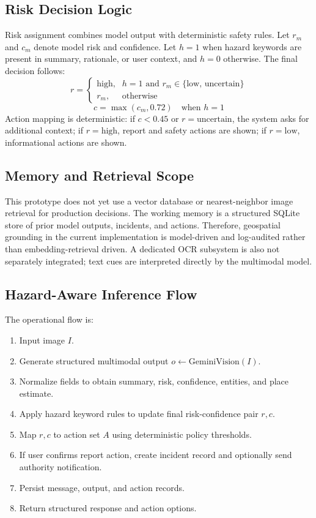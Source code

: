 \documentclass[10pt,conference]{IEEEtran}
\begin{document}
\subsection{Risk Decision Logic}
Risk assignment combines model output with deterministic safety rules. Let $r_m$ and $c_m$ denote model risk and confidence. Let $h=1$ when hazard keywords are present in summary, rationale, or user context, and $h=0$ otherwise. The final decision follows:
\begin{equation}
r =
\begin{cases}
\text{high}, & h=1 \text{ and } r_m \in \{\text{low, uncertain}\} \\
r_m, & \text{otherwise}
\end{cases}
\end{equation}
\begin{equation}
c = \max(c_m, 0.72) \quad \text{when } h=1
\end{equation}
Action mapping is deterministic: if $c<0.45$ or $r=\text{uncertain}$, the system asks for additional context; if $r=\text{high}$, report and safety actions are shown; if $r=\text{low}$, informational actions are shown.

\subsection{Memory and Retrieval Scope}
This prototype does not yet use a vector database or nearest-neighbor image retrieval for production decisions. The working memory is a structured SQLite store of prior model outputs, incidents, and actions. Therefore, geospatial grounding in the current implementation is model-driven and log-audited rather than embedding-retrieval driven. A dedicated OCR subsystem is also not separately integrated; text cues are interpreted directly by the multimodal model.

\subsection{Hazard-Aware Inference Flow}
The operational flow is:
\begin{enumerate}
\item Input image $I$.
\item Generate structured multimodal output $o \leftarrow \mathrm{GeminiVision}(I)$.
\item Normalize fields to obtain summary, risk, confidence, entities, and place estimate.
\item Apply hazard keyword rules to update final risk-confidence pair $r,c$.
\item Map $r,c$ to action set $A$ using deterministic policy thresholds.
\item If user confirms report action, create incident record and optionally send authority notification.
\item Persist message, output, and action records.
\item Return structured response and action options.
\end{enumerate}
\end{document}
